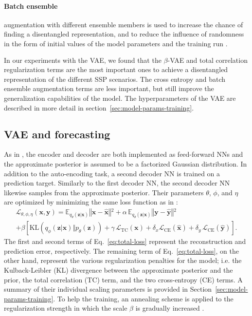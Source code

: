 \documentclass[english,a4paper,10pt]{scrartcl}
\begin{document}
\paragraph{Batch ensemble}
augmentation with different ensemble members is used to increase the chance of finding a disentangled representation, and to reduce the influence of randomness in the form of initial values of the model parameters and the training run \citep{Wen.Tran.ea.2020}.

In our experiments with the VAE, we found that the $\beta$-VAE and total correlation regularization terms are the most important ones to achieve a disentangled representation of the different SSP scenarios. The cross entropy and batch ensemble augmentation terms are less important, but still improve the generalization capabilities of the model. The hyperparameters of the VAE are described in more detail in section~\ref{sec:model-params-training}.

\subsection{VAE and forecasting}

As in \cite{Groth.precip-predict.2023}, the encoder and decoder are both implemented as feed-forward NNs and the approximate posterior is assumed to be a factorized Gaussian distribution. In addition to the auto-encoding task, a second decoder NN is trained on a prediction target. Similarly to the first decoder NN, the second decoder NN likewise samples from the approximate posterior. Their parameters $\theta$, $\phi$, and $\eta$ are optimized by minimizing the same loss function as in \cite{Groth.precip-predict.2023}:
\begin{multline}
    \mathcal{L}{}_{\theta,\phi,\eta}(\mathbf{x},\mathbf{y})=\mathbb{E}_{q_{\theta}(\mathbf{z}|\mathbf{x})}\left\Vert \mathbf{x}-\hat{\mathbf{x}}\right\Vert {}^{2}+\alpha\,\mathbb{E}_{q_{\theta}(\mathbf{z}|\mathbf{x})}\left\Vert \mathbf{y}-\hat{\mathbf{y}}\right\Vert {}^{2}\\
    +\beta\left[\mathrm{KL}\left(q_{\phi}(\mathbf{z}|\mathbf{x})\Vert p_{\theta}(\mathbf{z})\right)+\gamma\,\mathcal{L}_{\mathrm{TC}}(\mathbf{x})+\delta_{x}\mathcal{L}_{\mathrm{CE}}(\hat{\mathbf{x}})+\delta_{y}\,\mathcal{L}_{\mathrm{CE}}(\mathbf{\hat{y}})\right].\label{eq:total-loss}
\end{multline}
The first and second terms of Eq.~\eqref{eq:total-loss} represent the reconstruction and prediction error, respectively. The remaining term of Eq.~\eqref{eq:total-loss}, on the other hand, represent the various regularization penalties for the model; i.e. the Kulback-Leibler (KL) divergence between the approximate posterior and the prior, the total correlation (TC) term, and the two cross-entropy (CE) terms. A summary of their individual scaling parameters is provided in Section~\ref{sec:model-params-training}. To help the training, an annealing scheme is applied to the regularization strength in which the scale $\beta$ is gradually increased \citep{Bowman.Vilnis.ea.2015}.
\end{document}
